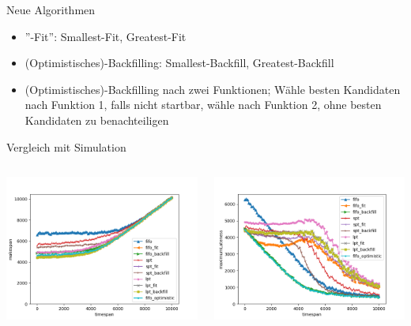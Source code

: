 \documentclass[aspectratio=169,10pt]{beamer}
\begin{document}
\begin{frame}[t, fragile]{Neue Algorithmen}
\begin{itemize}[<+->]
	\item ''-Fit'': Smallest-Fit, Greatest-Fit
	\item (Optimistisches)-Backfilling: Smallest-Backfill, Greatest-Backfill
	\item (Optimistisches)-Backfilling nach zwei Funktionen; W\"ahle besten Kandidaten nach Funktion 1, falls nicht startbar, w\"ahle nach Funktion 2, ohne besten Kandidaten zu benachteiligen
\end{itemize}
\end{frame}
\begin{frame}[t, fragile]{Vergleich mit Simulation}
	\begin{columns}
		\begin{column}{0.5\paperwidth}
			\vspace{0.5pt}
			\includegraphics[width=\linewidth, clip]{images/Figure_7_1}
		\end{column}
		\begin{column}[c]{0.5\paperwidth}
			\includegraphics[width=\linewidth, clip]{images/Figure_7_2}
		\end{column}
	\end{columns}
\end{frame}
\end{document}
